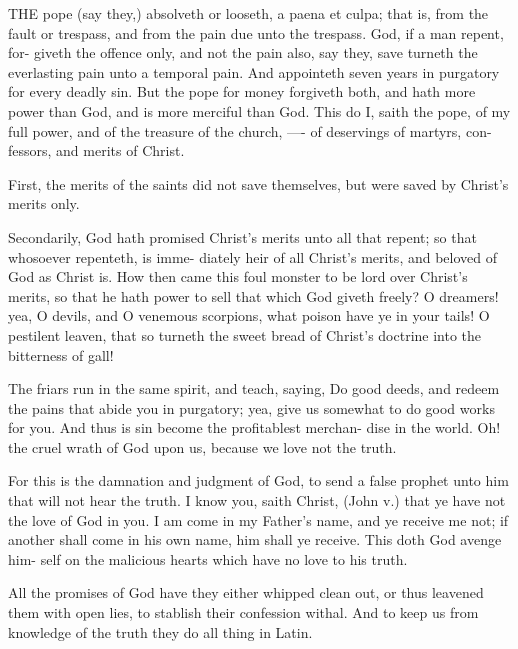 \documentclass{custom}
\begin{document}
THE pope (say they,) absolveth or looseth, a paena et 
culpa; that is, from the fault or trespass, and from the 
pain due unto the trespass. God, if a man repent, for- 
giveth the offence only, and not the pain also, say they, 
save turneth the everlasting pain unto a temporal pain. 
And appointeth seven years in purgatory for every deadly 
sin. But the pope for money forgiveth both, and hath 
more power than God, and is more merciful than God. 
This do I, saith the pope, of my full power, and of the 
treasure of the church, —- of deservings of martyrs, con- 
fessors, and merits of Christ. 

First, the merits of the saints did not save themselves, 
but were saved by Christ's merits only. 

Secondarily, God hath promised Christ's merits unto 
all that repent; so that whosoever repenteth, is imme- 
diately heir of all Christ's merits, and beloved of God as 
Christ is. How then came this foul monster to be lord 
over Christ's merits, so that he hath power to sell that 
which God giveth freely? O dreamers! yea, O devils, 
and O venemous scorpions, what poison have ye in your 
tails! O pestilent leaven, that so turneth the sweet bread 
of Christ's doctrine into the bitterness of gall! 

The friars run in the same spirit, and teach, saying, 
Do good deeds, and redeem the pains that abide you in 
purgatory; yea, give us somewhat to do good works for 
you. And thus is sin become the profitablest merchan- 
dise in the world. Oh! the cruel wrath of God upon us, 
because we love not the truth. 

For this is the damnation and judgment of God, to 
send a false prophet unto him that will not hear the truth. 
I know you, saith Christ, (John v.) that ye have not the 
love of God in you. I am come in my Father's name, 
and ye receive me not; if another shall come in his own 
name, him shall ye receive. This doth God avenge him- 
self on the malicious hearts which have no love to his 
truth. 

All the promises of God have they either whipped clean 
out, or thus leavened them with open lies, to stablish 
their confession withal. And to keep us from knowledge 
of the truth they do all thing in Latin. 
\end{document}
